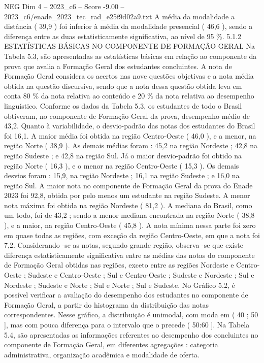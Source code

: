 \begin{textsample}{NEG Dim 4 – 2023\_c6 – Score -9.00 – 2023\_c6/enade\_2023\_tec\_rad\_e25f9d02a9.txt}
A média da modalidade a distância ( 39,9 ) foi inferior à média da modalidade presencial ( 46,6 ), sendo a diferença entre as duas estatisticamente significativa, ao nível de 95 \%. 5.1.2 ESTATÍSTICAS BÁSICAS NO COMPONENTE DE FORMAÇÃO GERAL Na Tabela 5.3, são apresentadas as estatísticas básicas em relação ao componente da prova que avalia a Formação Geral dos estudantes concluintes.
A nota de Formação Geral considera os acertos nas nove questões objetivas e a nota média obtida na questão discursiva, sendo que a nota dessa questão obtida leva em conta 80 \% da nota relativa ao conteúdo e 20 \% da nota relativa ao desempenho linguístico.
Conforme os dados da Tabela 5.3, os estudantes de todo o Brasil obtiveram, no componente de Formação Geral da prova, desempenho médio de 43,2.
Quanto à variabilidade, o desvio-padrão das notas dos estudantes do Brasil foi 16,1.
A maior média foi obtida na região Centro-Oeste ( 46,0 ), e a menor, na região Norte ( 38,9 ).
As demais médias foram : 45,2 na região Nordeste ; 42,8 na região Sudeste ; e 42,8 na região Sul.
Já o maior desvio-padrão foi obtido na região Norte ( 16,3 ), e o menor na região Centro-Oeste ( 15,3 ).
Os demais desvios foram : 15,9, na região Nordeste ; 16,1 na região Sudeste ; e 16,0 na região Sul.
A maior nota no componente de Formação Geral da prova do Enade 2023 foi 92,8, obtida por pelo menos um estudante na região Sudeste.
A menor nota máxima foi obtida na região Nordeste ( 81,2 ).
A mediana do Brasil, como um todo, foi de 43,2 ; sendo a menor mediana encontrada na região Norte ( 38,8 ), e a maior, na região Centro-Oeste ( 45,8 ).
A nota mínima nessa parte foi zero em quase todas as regiões, com exceção da região Centro-Oeste, em que a nota foi 7,2.
Considerando -se as notas, segundo grande região, observa -se que existe diferença estatisticamente significativa entre as médias das notas do componente de Formação Geral obtidas nas regiões, exceto entre as regiões Nordeste e Centro-Oeste ; Sudeste e Centro-Oeste ; Sul e Centro-Oeste ; Sudeste e Nordeste ; Sul e Nordeste ; Sudeste e Norte ; Sul e Norte ; Sul e Sudeste.
No Gráfico 5.2, é possível verificar a avaliação do desempenho dos estudantes no componente de Formação Geral, a partir do histograma da distribuição das notas correspondentes.
Nesse gráfico, a distribuição é unimodal, com moda em ( 40 ; 50 ], mas com pouca diferença para o intervalo que o precede ( 50:60 ].
Na Tabela 5.4, são apresentadas as informações referentes ao desempenho dos concluintes no componente de Formação Geral, em diferentes agregações : categoria administrativa, organização acadêmica e modalidade de oferta.

\end{textsample}
